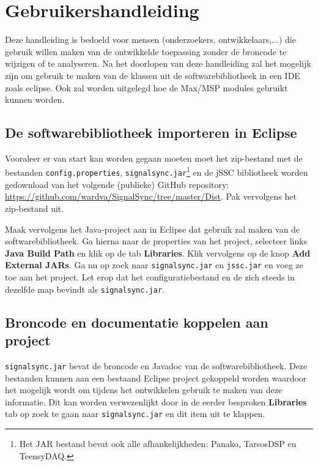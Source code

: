 \chapter{Gebruikershandleiding}
\label{appendix-f}

Deze handleiding is bedoeld voor mensen (onderzoekers, ontwikkelaars,...) die gebruik willen maken van de ontwikkelde toepassing zonder de broncode te wijzigen of te analyseren. Na het doorlopen van deze handleiding zal het mogelijk zijn om gebruik te maken van de klassen uit de softwarebibliotheek in een IDE zoals eclipse. Ook zal worden uitgelegd hoe de Max/MSP modules gebruikt kunnen worden.

\section*{De softwarebibliotheek importeren in Eclipse}

Vooraleer er van start kan worden gegaan moeten moet het zip-bestand met de bestanden \texttt{config.properties}, \texttt{signalsync.jar}\footnote{Het JAR bestand bevat ook alle afhankelijkheden: Panako\cite{six2014panako}, TarsosDSP\cite{six2014tarsosdsp} en TeensyDAQ.} en de jSSC bibliotheek worden gedownload van het volgende (publieke) GitHub repository:
\url{https://github.com/wardva/SignalSync/tree/master/Dist}. Pak vervolgens het zip-bestand uit.

Maak vervolgens het Java-project aan in Eclipse dat gebruik zal maken van de softwarebibliotheek. Ga hierna naar de properties van het project, selecteer links \textbf{Java Build Path} en klik op de tab \textbf{Libraries}. Klik vervolgens op de knop \textbf{Add External JARs}. Ga nu op zoek naar \texttt{signalsync.jar} en \texttt{jssc.jar} en voeg ze toe aan het project. Let erop dat het configuratiebestand en de zich steeds in dezelfde map bevindt als \texttt{signalsync.jar}.

\section*{Broncode en documentatie koppelen aan project}

\texttt{signalsync.jar} bevat de broncode en Javadoc van de softwarebibliotheek. Deze bestanden kunnen aan een bestaand Eclipse project gekoppeld worden waardoor het mogelijk wordt om tijdens het ontwikkelen gebruik te maken van deze informatie. Dit kan worden verwezenlijkt door in de eerder besproken \textbf{Libraries} tab op zoek te gaan naar \texttt{signalsync.jar} en dit item uit te klappen. 

